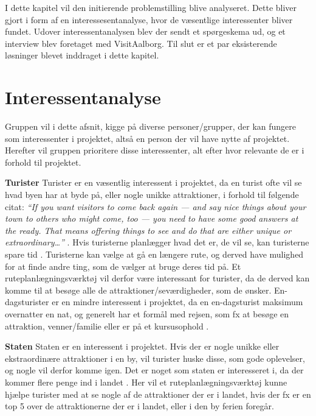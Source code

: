 I dette kapitel vil den initierende problemstilling blive analyseret. Dette bliver gjort i form af en interessesentanalyse, hvor de væsentlige interessenter bliver fundet. Udover interessentanalysen blev der sendt et spørgeskema ud, og et interview blev foretaget med VisitAalborg. Til slut er et par eksisterende løsninger blevet inddraget i dette kapitel. 

\section{Interessentanalyse}

Gruppen vil i dette afsnit, kigge på diverse personer/grupper, der kan fungere som interessenter i projektet, altså en person der vil have nytte af projektet. Herefter vil gruppen prioritere disse interessenter, alt efter hvor relevante de er i forhold til projektet.

\textbf{Turister}\newline
Turister er en væsentlig interessent i projektet, da en turist ofte vil se hvad byen har at byde på, eller nogle unikke attraktioner, i forhold til følgende citat: \newline 
\textit{“If you want visitors to come back again — and say nice things about your town to others who might come, too — you need to have some good answers at the ready. That means offering things to see and do that are either unique or extraordinary…”} \citep{UniversityOfMinnesota}.\newline 
Hvis turisterne planlægger hvad det er, de vil se, kan turisterne spare tid \citep{YouthCentral}. Turisterne kan vælge at gå en længere rute, og derved have mulighed for at finde andre ting, som de vælger at bruge deres tid på. Et ruteplanlægningsværktøj vil derfor være interessant for turister, da de derved kan komme til at besøge alle de attraktioner/seværdigheder, som de ønsker.
En-dagsturister er en mindre interessent i projektet, da en en-dagsturist maksimum overnatter en nat, og generelt har et formål med rejsen, som fx at besøge en attraktion, venner/familie eller er på et kursusophold \citep{Faxe}.

\textbf{Staten}\newline
Staten er en interessent i projektet. Hvis der er nogle unikke eller ekstraordinære attraktioner i en by, vil turister huske disse, som gode oplevelser, og nogle vil derfor komme igen. Det er noget som staten er interesseret i, da der kommer flere penge ind i landet \citep{VisitAalborg}.
Her vil et ruteplanlægningsværktøj kunne hjælpe turister med at se nogle af de attraktioner der er i landet, hvis der fx er en top 5 over de attraktionerne der er i landet, eller i den by ferien foregår.

